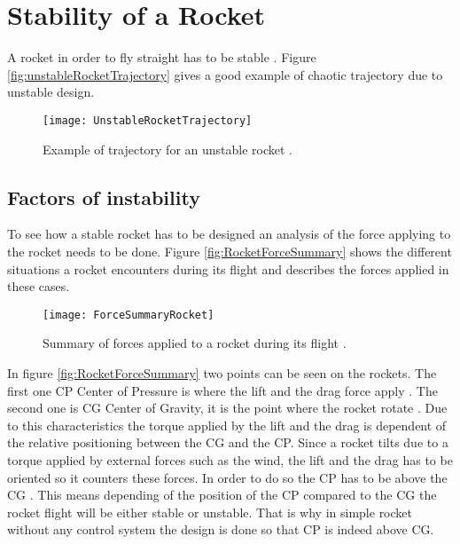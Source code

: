 \section{Stability of a Rocket}
\graphicspath{{figures/"Preanalysis&Requirement"/RocketStability/}}
A rocket in order to fly straight has to be stable \cite{web:rocketnasa}. Figure \vref{fig:unstableRocketTrajectory} gives a good example of chaotic trajectory due to unstable design.

\begin{figure} [htbp]
	\centering
	\texttt{[image: UnstableRocketTrajectory]}
	\caption{Example of trajectory for an unstable rocket \cite{web:rocketnasa}.}
	\label{fig:unstableRocketTrajectory}
\end{figure}

\subsection{Factors of instability}
To see how a stable rocket has to be designed an analysis of the force applying to the rocket needs to be done. Figure \vref{fig:RocketForceSummary} shows the different situations a rocket encounters during its flight and describes the forces applied in these cases.

\begin{figure} [htbp]
	\centering
	\texttt{[image: ForceSummaryRocket]}
	\caption{Summary of forces applied to a rocket during its flight \cite{web:rocketnasa}.}
	\label{fig:RocketForceSummary}
\end{figure}

In figure \vref{fig:RocketForceSummary} two points can be seen on the rockets. The first one CP Center of Pressure is where the  lift and the drag force apply \cite{web:rocketnasa}. The second one is CG Center of Gravity, it is the point where the rocket rotate \cite{web:rocketnasa}. Due to this characteristics the torque applied by the lift and the drag is dependent of the relative positioning between the CG and the CP. Since a rocket tilts due to a torque applied by external forces such as the wind, the lift and the drag has to be oriented so it counters these forces. In order to do so the CP has to be above the CG \cite{web:rocketnasa}.
This means depending of the position of the CP compared to the CG the rocket flight will be either stable or unstable. That is why in simple rocket without any control system the design is done so that CP is indeed above CG.

